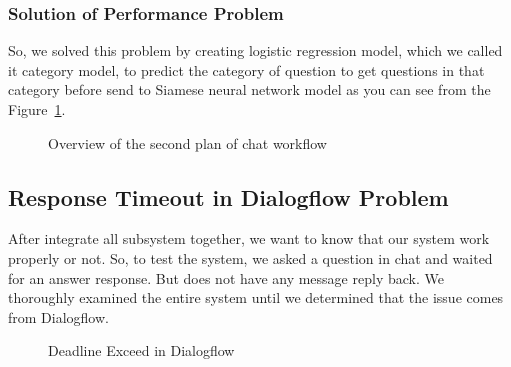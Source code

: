 \documentclass[12pt,oneside,openright,a4paper]{cpe-english-project}
\begin{document}
\subsubsection{Solution of Performance Problem}
So, we solved this problem by creating logistic regression model, which we called it category model,
to predict the category of question to get questions in that category before send to Siamese neural
network model as you can see from the Figure~\ref*{fig:model_pattern1}.

\begin{figure}[!h]\centering
{}
\caption{Overview of the second plan of chat workflow}
\label{fig:model_pattern1}
\end{figure}

\subsection{Response Timeout in Dialogflow Problem}
After integrate all subsystem together, we want to know that our system work properly or not.
So, to test the system, we asked a question in chat and waited for an answer response. But does not have
any message reply back. We thoroughly examined the entire system until we determined that the issue
comes from Dialogflow.

\begin{figure}[!h]\centering
{}
\caption{Deadline Exceed in Dialogflow}
\label{fig:dialogflow_deadline_exceed}
\end{figure}
\end{document}
